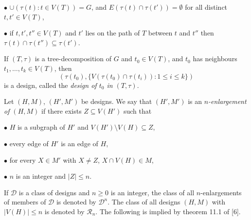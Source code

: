 \hspace*{12pt}$\bullet$ $\cup(\tau(t) \colon t \in V(T)) = G$, and $E(\tau(t) \cap \tau(t')) = \emptyset$ for all distinct $t, t' \in V(T)$,

\hspace*{12pt}$\bullet$ if $t, t', t'' \in V(T)$ and $t'$ lies on the path of $T$ between $t$ and $t''$ then $\tau(t) \cap \tau(t'') \subseteq \tau(t')$.

If $(T, \tau)$ is a tree-decomposition of $G$ and $t_0 \in V(T)$, and $t_0$ has neighbours $t_1, \ldots, t_k \in V(T)$, then
\begin{equation*}
(\tau(t_0), \{V(\tau(t_0) \cap \tau(t_i)) \colon 1 \le i \le k\})
\end{equation*}
is a design, called the \textit{design of $t_0$ in $(T, \tau)$}.

Let $(H, M)$, $(H', M')$ be designs. We say that $(H', M')$ is an \textit{$n$-enlargement of $(H, M)$} if there exists $Z \subseteq V(H')$ such that

\hspace*{12pt}$\bullet$ $H$ is a subgraph of $H'$ and $V(H') \setminus V(H) \subseteq Z$,

\hspace*{12pt}$\bullet$ every edge of $H'$ is an edge of $H$,

\hspace*{12pt}$\bullet$ for every $X \in M'$ with $X \ne Z$, $X \cap V(H) \in M$,

\hspace*{12pt}$\bullet$ $n$ is an integer and $|Z| \le n$.

If $\mathscr{D}$ is a class of designs and $n \ge 0$ is an integer, the class of all $n$-enlargements of members of $\mathscr{D}$ is denoted by $\mathscr{D}^n$. The class of all designs $(H, M)$ with $|V(H)| \le n$ is denoted by $\mathscr{R}_n$. The following is implied by theorem 11.1 of [6].
